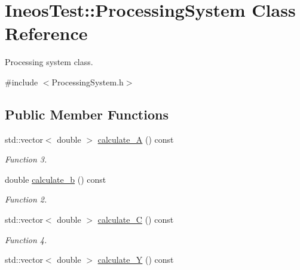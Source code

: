 \hypertarget{classIneosTest_1_1ProcessingSystem}{\section{Ineos\-Test\-:\-:Processing\-System Class Reference}
\label{classIneosTest_1_1ProcessingSystem}
}


Processing system class.  




{\ttfamily \#include $<$Processing\-System.\-h$>$}

\subsection*{Public Member Functions}
\begin{DoxyCompactItemize}
\item 
\hypertarget{classIneosTest_1_1ProcessingSystem_a80b43f0e19c1adaca40f045920048977}{std\-::vector$<$ double $>$ \hyperlink{classIneosTest_1_1ProcessingSystem_a80b43f0e19c1adaca40f045920048977}{calculate\-\_\-\-A} () const }\label{classIneosTest_1_1ProcessingSystem_a80b43f0e19c1adaca40f045920048977}

\begin{DoxyCompactList}\small\item\em Function 3. \end{DoxyCompactList}\item 
\hypertarget{classIneosTest_1_1ProcessingSystem_a5383bb533e439f0dd743590687b98cf8}{double \hyperlink{classIneosTest_1_1ProcessingSystem_a5383bb533e439f0dd743590687b98cf8}{calculate\-\_\-b} () const }\label{classIneosTest_1_1ProcessingSystem_a5383bb533e439f0dd743590687b98cf8}

\begin{DoxyCompactList}\small\item\em Function 2. \end{DoxyCompactList}\item 
\hypertarget{classIneosTest_1_1ProcessingSystem_ab94a35c82071057c1590a0c187a4e437}{std\-::vector$<$ double $>$ \hyperlink{classIneosTest_1_1ProcessingSystem_ab94a35c82071057c1590a0c187a4e437}{calculate\-\_\-\-C} () const }\label{classIneosTest_1_1ProcessingSystem_ab94a35c82071057c1590a0c187a4e437}

\begin{DoxyCompactList}\small\item\em Function 4. \end{DoxyCompactList}\item 
\hypertarget{classIneosTest_1_1ProcessingSystem_a3729dc6761d6fd1212e53cc0d092230b}{std\-::vector$<$ double $>$ \hyperlink{classIneosTest_1_1ProcessingSystem_a3729dc6761d6fd1212e53cc0d092230b}{calculate\-\_\-\-Y} () const }\label{classIneosTest_1_1ProcessingSystem_a3729dc6761d6fd1212e53cc0d092230b}


\end{DoxyCompactItemize}
